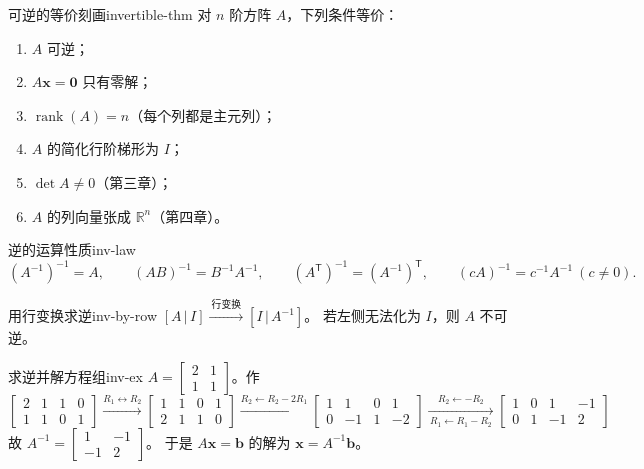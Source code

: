 \documentclass[11pt,a4paper,openany]{ctexbook}
\DeclareMathOperator{\rank}{rank}
\newcommand{\Rnum}[1]{\mathbb{R}^{#1}}
\begin{document}
\begin{thm}{可逆的等价刻画}{invertible-thm}
对 $n$ 阶方阵 $A$，下列条件等价：
\begin{enumerate}[label=(\alph*)]
\item $A$ 可逆；
\item $A\boldsymbol{x}=\boldsymbol{0}$ 只有零解；
\item $\rank(A)=n$（每个列都是主元列）；
\item $A$ 的简化行阶梯形为 $I$；
\item $\det A\neq 0$（第三章）；
\item $A$ 的列向量张成 $\Rnum{n}$（第四章）。
\end{enumerate}
\end{thm}

\begin{prop}{逆的运算性质}{inv-law}
\[
(A^{-1})^{-1}=A,\qquad (AB)^{-1}=B^{-1}A^{-1},\qquad
(A^{\mathsf T})^{-1}=(A^{-1})^{\mathsf T},\qquad (cA)^{-1}=c^{-1}A^{-1}\ (c\neq0).
\]
\end{prop}

\begin{prop}{用行变换求逆}{inv-by-row}
$[A\,|\,I]\xrightarrow{\ \text{行变换}\ }[I\,|\,A^{-1}]$。
若左侧无法化为 $I$，则 $A$ 不可逆。
\end{prop}

\begin{exmp}{求逆并解方程组}{inv-ex}
$A=\begin{bmatrix}2&1\\1&1\end{bmatrix}$。作
$\left[\begin{array}{cc|cc}2&1&1&0\\1&1&0&1\end{array}\right]
\xrightarrow{R_1\leftrightarrow R_2}
\left[\begin{array}{cc|cc}1&1&0&1\\2&1&1&0\end{array}\right]
\xrightarrow{R_2\leftarrow R_2-2R_1}
\left[\begin{array}{cc|cc}1&1&0&1\\0&-1&1&-2\end{array}\right]
\xrightarrow[\,R_1\leftarrow R_1-R_2\,]{R_2\leftarrow -R_2}
\left[\begin{array}{cc|cc}1&0&1&-1\\0&1&-1&2\end{array}\right]$
故 $A^{-1}=\begin{bmatrix}1&-1\\-1&2\end{bmatrix}$。
于是 $A\boldsymbol{x}=\boldsymbol{b}$ 的解为 $\boldsymbol{x}=A^{-1}\boldsymbol{b}$。
\end{exmp}
\end{document}
